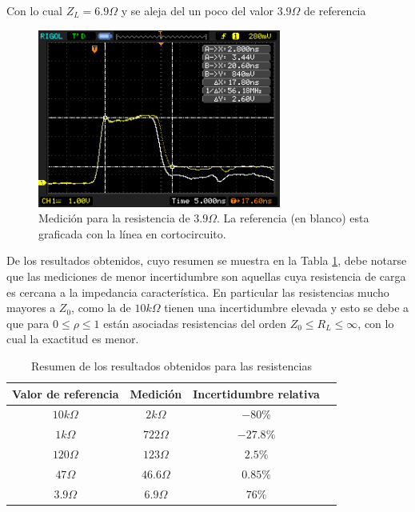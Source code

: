 \documentclass[a4paper,10pt]{article}
\begin{document}
	\indent Con lo cual $Z_L=6.9\Omega$ y se aleja del un poco del valor 
	$3.9\Omega$ de referencia
		
		\begin{figure}[!htb]
			\centering
			\includegraphics[width=8cm]
			{Imagenes/Res3e9.png}
			\caption{Medici\'on para la resistencia de $3.9\Omega$. La 
			referencia (en blanco) esta graficada con la l\'inea en 
			cortocircuito.}
			\label{img005}
		\end{figure}

	\indent De los resultados obtenidos, cuyo resumen se muestra en la Tabla 
	\ref{tab001}, debe notarse que las mediciones de menor incertidumbre son 
	aquellas cuya resistencia de carga es cercana a la impedancia 
	caracter\'istica. En particular las resistencias mucho mayores a $Z_0$, como
	la de $10k\Omega$ tienen una incertidumbre elevada y esto se debe a que para
	$0\leq \rho \leq 1$ est\'an asociadas resistencias del orden 
	$Z_0 \leq R_L \leq \infty$, con lo cual la exactitud es menor.
	
		\begin{table}[!htp]
			\centering
			\begin{tabular}{|c|c|c|c|}
				\hline
    			Valor de referencia & Medici\'on & Incertidumbre relativa \\
				\hline
				$10k\Omega$ & $2k\Omega$ &$-80 \% $ \\
				\hline 
				$1k\Omega$ & $722\Omega$ &$-27.8\%$\\
				\hline
				$120\Omega$ & $123\Omega$ &$2.5\% $ \\
				\hline
				$47\Omega$ & $46.6\Omega$ &$0.85\% $ \\
				\hline
				$3.9\Omega$ & $6.9\Omega$ &$76\% $  \\
				\hline								
			\end{tabular}
			\caption{Resumen de los resultados obtenidos para las resistencias
			} 
			\label{tab001}
		\end{table}
		
\end{document}
